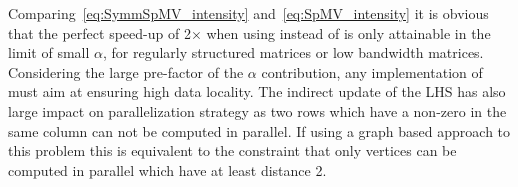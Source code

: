 Comparing~\cref{eq:SymmSpMV_intensity} and~\cref{eq:SpMV_intensity} it is obvious that the perfect speed-up of 2$\times$ when using \SymmSpmv instead of \SpMV is only attainable in the limit of small $\alpha$, \ie for regularly structured matrices or low bandwidth matrices. Considering the large pre-factor of the $\alpha$ contribution, any implementation of \SymmSpmv must aim at ensuring high data locality. The indirect update of the LHS has also large impact on parallelization strategy as two rows which have a non-zero in the same column can not be computed in parallel. If using a graph based approach to this problem this is equivalent to the constraint that only vertices can be computed in parallel which have at least distance 2.

\begin{comment}
\subsubsection{\GS and \SYMMGS}
Gauss-Seidel (\GS) is a solver having distance-1 dependency. Contrary to the above kernels \GS is in-exact meaning it is an iterative method. \Cref{alg:GS} shows the Gauss-Seidel algorithm where its assumed that the diagonal entries of the matrix are stored as first entry in their corresponding rows.
\begin{algorithm}[H]
	\caption{GS Solve for $x$ : $Ax=b$} 
	\label{alg:GS}
	\begin{algorithmic}[1]
		\FOR{$row=1:nrows$}
		\STATE{$x[row]+=b[row]$}
		\FOR{$idx=rowPtr[row]+1:rowPtr[row+1]$}
		\STATE{$x[row] -= A[idx]*x[col[idx]]$} 
		\ENDFOR
		\STATE{$diag=A[rowPtr[row]]$}
		\STATE{$x[row]/=diag$}
		\ENDFOR
	\end{algorithmic}
\end{algorithm}
Regarding the in-core execution the kernel has same properties as of \SpMV, but requires an additional divide operation per row of the matrix. If the locality ($\alpha$ factor) is not disturbed due to pre-processing the kernel requires same data traffic as of \SpMV. The arithmetic intensity of \GS is the same as that of \SpMV, if we neglect the divide operation that occurs once per every row.
\begin{equation}
\label{eq:GS_intensity}
I_\mathrm{GS} = I_\mathrm{SPMV}
\end{equation}



In general for most of the algorithms one is interested in symmetric operator therefore commonly one would encounter symmetric variant of Gauss-Seidel, so called symmetric Gauss-Seidel (\SYMMGS). The algorithm remains same except that instead of just doing forward sweep shown in \cref{alg:GS} one would follow it with a backward sweep \ie {\tt row=nrows:-1:1}. The intensity of \SYMMGS remains same as of \GS, as we do two times more flops and bring in proportional data.
\end{comment}


